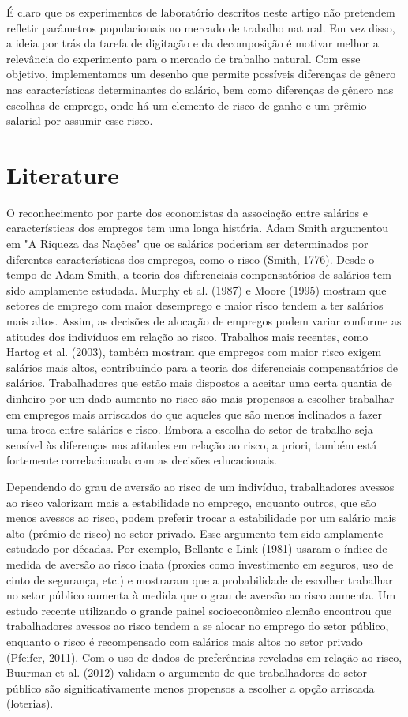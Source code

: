 \documentclass[a4paper,12pt]{article}[abntex2]
\begin{document}
É claro que os experimentos de laboratório descritos neste artigo não pretendem refletir parâmetros populacionais no mercado de trabalho natural. Em vez disso, a ideia por trás da tarefa de digitação e da decomposição é motivar melhor a relevância do experimento para o mercado de trabalho natural. Com esse objetivo, implementamos um desenho que permite possíveis diferenças de gênero nas características determinantes do salário, bem como diferenças de gênero nas escolhas de emprego, onde há um elemento de risco de ganho e um prêmio salarial por assumir esse risco.


\section{\textbf{Literature}}

O reconhecimento por parte dos economistas da associação entre salários e características dos empregos tem uma longa história. Adam Smith argumentou em "A Riqueza das Nações" que os salários poderiam ser determinados por diferentes características dos empregos, como o risco (Smith, 1776). Desde o tempo de Adam Smith, a teoria dos diferenciais compensatórios de salários tem sido amplamente estudada. Murphy et al. (1987) e Moore (1995) mostram que setores de emprego com maior desemprego e maior risco tendem a ter salários mais altos. Assim, as decisões de alocação de empregos podem variar conforme as atitudes dos indivíduos em relação ao risco. Trabalhos mais recentes, como Hartog et al. (2003), também mostram que empregos com maior risco exigem salários mais altos, contribuindo para a teoria dos diferenciais compensatórios de salários. Trabalhadores que estão mais dispostos a aceitar uma certa quantia de dinheiro por um dado aumento no risco são mais propensos a escolher trabalhar em empregos mais arriscados do que aqueles que são menos inclinados a fazer uma troca entre salários e risco. Embora a escolha do setor de trabalho seja sensível às diferenças nas atitudes em relação ao risco, a priori, também está fortemente correlacionada com as decisões educacionais.

Dependendo do grau de aversão ao risco de um indivíduo, trabalhadores avessos ao risco valorizam mais a estabilidade no emprego, enquanto outros, que são menos avessos ao risco, podem preferir trocar a estabilidade por um salário mais alto (prêmio de risco) no setor privado. Esse argumento tem sido amplamente estudado por décadas. Por exemplo, Bellante e Link (1981) usaram o índice de medida de aversão ao risco inata (proxies como investimento em seguros, uso de cinto de segurança, etc.) e mostraram que a probabilidade de escolher trabalhar no setor público aumenta à medida que o grau de aversão ao risco aumenta. Um estudo recente utilizando o grande painel socioeconômico alemão encontrou que trabalhadores avessos ao risco tendem a se alocar no emprego do setor público, enquanto o risco é recompensado com salários mais altos no setor privado (Pfeifer, 2011). Com o uso de dados de preferências reveladas em relação ao risco, Buurman et al. (2012) validam o argumento de que trabalhadores do setor público são significativamente menos propensos a escolher a opção arriscada (loterias).
\end{document}
